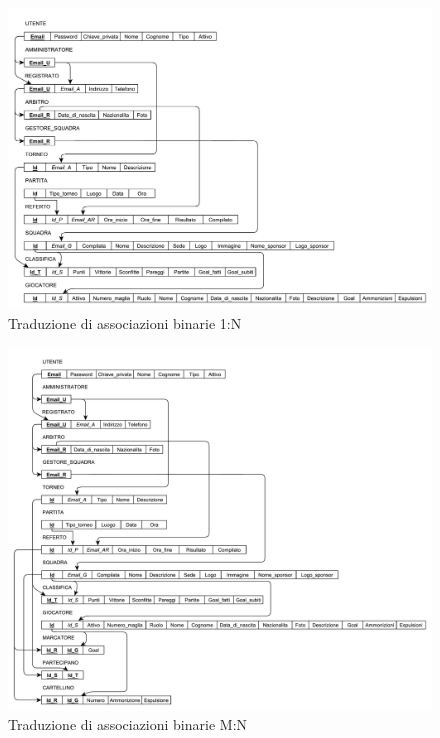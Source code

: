 	\begin{figure}[h]
		\centering
		\includegraphics[width=1\textwidth]
		{immagini/traduzione-associazioni-1-N}
		
		\caption{Traduzione di associazioni binarie 1:N}
	\end{figure}
	
	\begin{figure}[h]
		\centering
		\includegraphics[width=1\textwidth]
		{immagini/traduzione-associazioni-M-N}
		
		\caption{Traduzione di associazioni binarie M:N}
	\end{figure}
	
